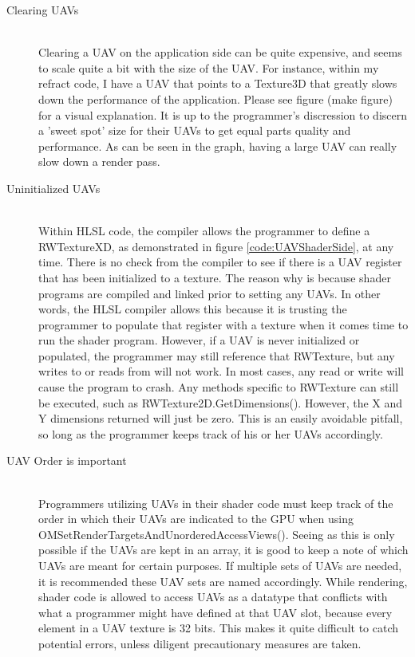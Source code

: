 \documentclass[a4paper, 12pt]{article}
\begin{document}
\begin{description}

\item[Clearing UAVs] \hfill \\ 

Clearing a UAV on the application side can be quite expensive, and seems to
scale quite a bit with the size of the UAV. For instance, within my refract
code, I have a UAV that points to a Texture3D that greatly slows down the
performance of the application. Please see figure (make figure) for a visual
explanation. It is up to the programmer's discression to discern a 'sweet
spot' size for their UAVs to get equal parts quality and performance. As can
be seen in the graph, having a large UAV can really slow down a render pass.

\item[Uninitialized UAVs] \hfill \\

Within HLSL code, the compiler allows the programmer to define a RWTextureXD,
as demonstrated in figure \ref{code:UAVShaderSide}, at any time. There is no
check from the compiler to see if there is a UAV register that has been
initialized to a texture. The reason why is because shader programs are
compiled and linked prior to setting any UAVs. In other words, the HLSL
compiler allows this because it is trusting the programmer to populate that
register with a texture when it comes time to run the shader program. However,
if a UAV is never initialized or populated, the programmer may still reference
that RWTexture, but any writes to or reads from will not work. In most cases,
any read or write will cause the program to crash. Any methods specific to
RWTexture can still be executed, such as RWTexture2D.GetDimensions(). However,
the X and Y dimensions returned will just be zero. This is an easily avoidable
pitfall, so long as the programmer keeps track of his or her UAVs accordingly.

\item[UAV Order is important] \hfill \\

Programmers utilizing UAVs in their shader code must keep track of the order
in which their UAVs are indicated to the GPU when using
OMSetRenderTargetsAndUnorderedAccessViews(). Seeing as this is only possible
if the UAVs are kept in an array, it is good to keep a note of which UAVs are
meant for certain purposes. If multiple sets of UAVs are needed, it is
recommended these UAV sets are named accordingly. While rendering, shader code
is allowed to access UAVs as a datatype that conflicts with what a programmer
might have defined at that UAV slot, because every element in a UAV texture is
32 bits. This makes it quite difficult to catch potential errors, unless
diligent precautionary measures are taken.

\end{description}
\end{document}
